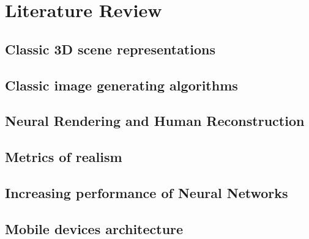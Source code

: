 \chapter{Literature Review}\label{chapter:lit}

\section{Classic 3D scene representations}
\label{lit:classic-repr}

\section{Classic image generating algorithms}
\label{lit:classic-algo}

\section{Neural Rendering and Human Reconstruction}
\label{lit:nrender}

\section{Metrics of realism}
\label{lit:metrics}

\section{Increasing performance of Neural Networks}
\label{lit:dnn-speedup}

\section{Mobile devices architecture}
\label{lit:mobile}